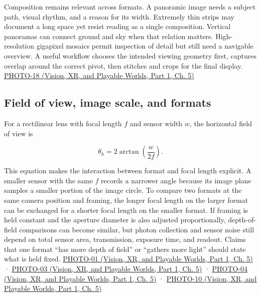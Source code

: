Composition remains relevant across formats. A panoramic image needs a subject path, visual rhythm, and a reason for its width. Extremely thin strips may document a long space yet resist reading as a single composition. Vertical panoramas can connect ground and sky when that relation matters. High-resolution gigapixel mosaics permit inspection of detail but still need a navigable overview. A useful workflow chooses the intended viewing geometry first, captures overlap around the correct pivot, then stitches and crops for the final display. \href{../07-Vision-XR-and-Playable-Worlds-P01/main.pdf\#nameddest=04-visual-computing-ii-ch036-photo-18---photography-session-18}{PHOTO-18 (Vision, XR, and Playable Worlds, Part 1, Ch. 5)}

\subsection{Field of view, image scale, and formats}\label{03-visual-computing-i-ch003-field-of-view-image-scale-and-formats}

\hypertarget{03-visual-computing-i-ch003-field-of-view-image-scale-and-formats}{}

For a rectilinear lens with focal length \(f\) and sensor width \(w\), the horizontal field of view is

\[
\theta_h=2\arctan\left(\frac{w}{2f}\right).
\]

This equation makes the interaction between format and focal length explicit. A smaller sensor with the same \(f\) records a narrower angle because its image plane samples a smaller portion of the image circle. To compare two formats at the same camera position and framing, the longer focal length on the larger format can be exchanged for a shorter focal length on the smaller format. If framing is held constant and the aperture diameter is also adjusted proportionally, depth-of-field comparisons can become similar, but photon collection and sensor noise still depend on total sensor area, transmission, exposure time, and readout. Claims that one format ``has more depth of field'' or ``gathers more light'' should state what is held fixed. \href{../07-Vision-XR-and-Playable-Worlds-P01/main.pdf\#nameddest=04-visual-computing-ii-ch036-photo-01---photography-session-01}{PHOTO-01 (Vision, XR, and Playable Worlds, Part 1, Ch. 5)} · \href{../07-Vision-XR-and-Playable-Worlds-P01/main.pdf\#nameddest=04-visual-computing-ii-ch036-photo-03---photography-session-03}{PHOTO-03 (Vision, XR, and Playable Worlds, Part 1, Ch. 5)} · \href{../07-Vision-XR-and-Playable-Worlds-P01/main.pdf\#nameddest=04-visual-computing-ii-ch036-photo-04---photography-session-04}{PHOTO-04 (Vision, XR, and Playable Worlds, Part 1, Ch. 5)} · \href{../07-Vision-XR-and-Playable-Worlds-P01/main.pdf\#nameddest=04-visual-computing-ii-ch036-photo-10---photography-session-10}{PHOTO-10 (Vision, XR, and Playable Worlds, Part 1, Ch. 5)}

